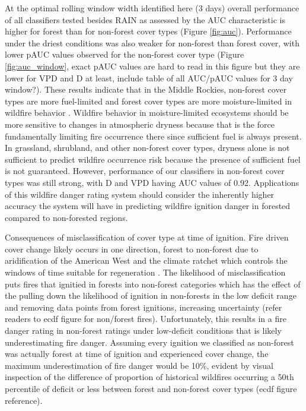 \documentclass[11p]{article}
\begin{document}
At the optimal rolling window width identified here (3 days) overall performance of all classifiers tested besides RAIN as assessed by the AUC characteristic is higher for forest than for non-forest cover types (Figure \ref{fig:auc}). Performance under the driest conditions was also weaker for non-forest than forest cover, with lower pAUC values observed for the non-forest cover type (Figure \ref{fig:auc_window}, exact pAUC values are hard to read in this figure but they are lower for VPD and D at least, include table of all AUC/pAUC values for 3 day window?). These results indicate that in the Middle Rockies, non-forest cover types are more fuel-limited and forest cover types are more moisture-limited in wildfire behavior \citep{meynEnvironmentalDriversLarge2007}. Wildfire behavior in moisture-limited ecosystems should be more sensitive to changes in atmospheric dryness because that is the force fundamentally limiting fire occurrence there since sufficient fuel is always present. In grassland, shrubland, and other non-forest cover types, dryness alone is not sufficient to predict wildfire occurrence risk because the presence of sufficient fuel is not guaranteed. However, performance of our classifiers in non-forest cover types was still strong, with D and VPD having AUC values of 0.92. Applications of this wildfire danger rating system should consider the inherently higher accuracy the system will have in predicting wildfire ignition danger in forested compared to non-forested regions.  

Consequences of misclassification of cover type at time of ignition. Fire driven cover change likely occurs in one direction, forest to non-forest due to aridification of the American West and the climate ratchet which controls the windows of time suitable for regeneration \citep{jacksonEcologyRatchetEvents2009}. The likelihood of misclassification puts fires that ignitied in forests into non-forest categories which has the effect of the pulling down the likelihood of ignition in non-forests in the low deficit range and removing data points from forest ignitions, increasing uncertainty (refer readers to ecdf figure for non/forest fires). Unfortunately, this results in a fire danger rating in non-forest ratings under low-deficit conditions that is likely underestimating fire danger. Assuming every ignition we classified as non-forest was actually forest at time of ignition and experienced cover change, the maximum underestimation of fire danger would be 10\%, evident by visual inspection of the difference of proportion of historical wildfires occurring a 50th percentile of deficit or less between forest and non-forest cover types (ecdf figure reference). 
\end{document}
